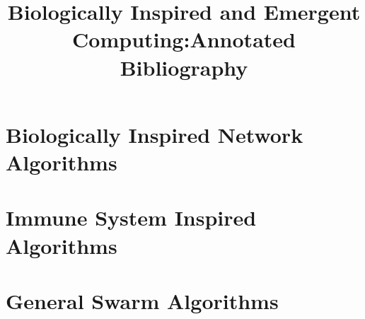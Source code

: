 

\bibliographyunit[\section]

\title{Biologically Inspired and Emergent Computing:Annotated Bibliography} 

\author{
}

\maketitle
\section{Biologically Inspired Network Algorithms}
\nocite{1543949}
\nocite{508968}
\nocite{1322308}
\nocite{1315848}
\putbib
\section{Immune System Inspired Algorithms}
\nocite{00538159}
\nocite{00970460}
\nocite{1018906}
\putbib
\section{General Swarm Algorithms}
\nocite{rouff-2004}
\nocite{1089771}
\putbib
